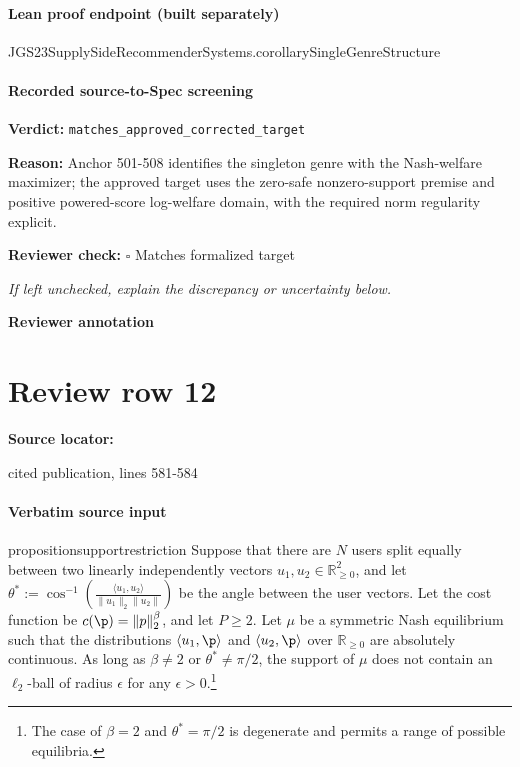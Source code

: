 \documentclass[10pt]{article}
\newcommand{\reviewerbox}{%
  \par\noindent\fbox{\parbox{0.96\linewidth}{\rule{0pt}{0.38in}}}\par
}
\newcommand{\reviewmatch}[1]{%
  \par\noindent\textbf{Reviewer check:} $\square$\; #1\par
  \noindent\emph{If left unchecked, explain the discrepancy or uncertainty below.}\par
}
\begin{document}
\paragraph{Lean proof endpoint (built separately)}\begin{ReviewVerbatim}
JGS23SupplySideRecommenderSystems.corollarySingleGenreStructure
\end{ReviewVerbatim}

\paragraph{Recorded source-to-Spec screening}
\textbf{Verdict:} \texttt{matches\_approved\_corrected\_target}
\\
{\raggedright
\textbf{Reason:} Anchor 501-\allowbreak{}508 identifies the singleton genre with the Nash-\allowbreak{}welfare maximizer;\allowbreak{} the approved target uses the zero-\allowbreak{}safe nonzero-\allowbreak{}support premise and positive powered-\allowbreak{}score log-\allowbreak{}welfare domain, with the required norm regularity explicit.\allowbreak{}
\par}
\reviewmatch{Matches formalized target}
\noindent\textbf{Reviewer annotation}\par
\reviewerbox
\clearpage
\hypertarget{source-claim-f35165b0b369f79c}{}
\section*{Review row 12}
\textbf{Source locator:} {\footnotesize\raggedright cited publication, lines 581-\allowbreak{}584\par}
\paragraph{Verbatim source input}
\begin{ReviewVerbatim}
\begin{restatable}{proposition}{supportrestriction}
\label{prop:supportrestriction}
Suppose that there are $N$ users split equally between two linearly independently vectors $u_1, u_2 \in \mathbb{R}_{\ge 0}^2$, and let $\theta^* := \cos^{-1}\left( \frac{\langle u_1, u_2\rangle}{\|u_1\|_2 \|u_2\|} \right)$ be the angle between the user vectors. Let the cost function be $c(\p) = \|p\|_2^{\beta}$, and let $P \ge 2$. Let $\mu$ be a symmetric Nash equilibrium such that the distributions $\langle u_1, \p\rangle$ and $\langle u_2, \p\rangle$ over $\mathbb{R}_{\ge 0}$ are absolutely continuous. As long as $\beta \neq 2$ or $\theta^* \neq \pi /2$, the support of $\mu$ does not contain an $\ell_2$-ball of radius $\epsilon$ for any $\epsilon > 0$.\footnote{The case of $\beta = 2$ and $\theta^* = \pi/2$ is degenerate and permits a range of possible equilibria.}
\end{restatable}
\end{ReviewVerbatim}
\end{document}
